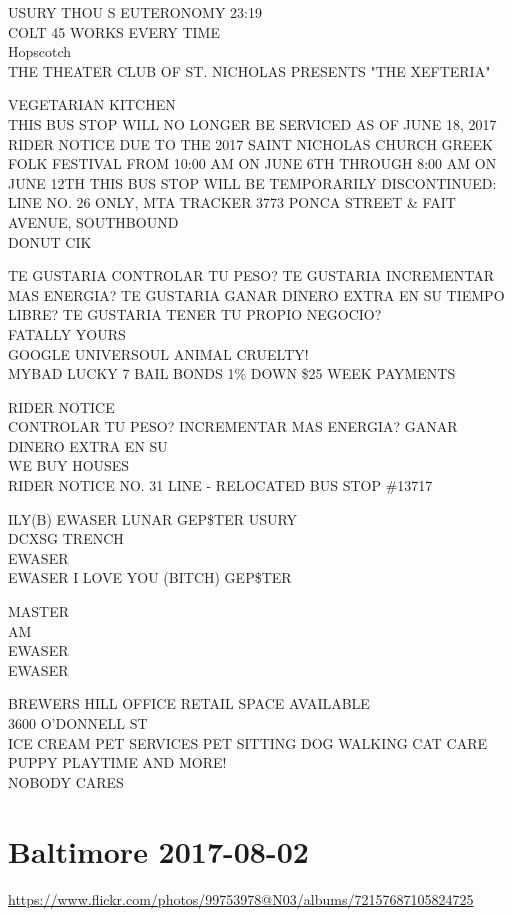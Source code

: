 \documentclass[10pt,letterpaper]{article}
\begin{document}
USURY THOU S EUTERONOMY 23:19\\
COLT 45 WORKS EVERY TIME\\
Hopscotch\\
THE THEATER CLUB OF ST. NICHOLAS PRESENTS "THE XEFTERIA"

VEGETARIAN KITCHEN\\
THIS BUS STOP WILL NO LONGER BE SERVICED AS OF JUNE 18, 2017\\
RIDER NOTICE DUE TO THE 2017 SAINT NICHOLAS CHURCH GREEK FOLK FESTIVAL FROM 10:00 AM ON JUNE 6TH THROUGH 8:00 AM ON JUNE 12TH THIS BUS STOP WILL BE TEMPORARILY DISCONTINUED: LINE NO. 26 ONLY, MTA TRACKER 3773 PONCA STREET \& FAIT AVENUE, SOUTHBOUND\\
DONUT CIK

TE GUSTARIA CONTROLAR TU PESO?  TE GUSTARIA INCREMENTAR MAS ENERGIA?  TE GUSTARIA GANAR DINERO EXTRA EN SU TIEMPO LIBRE?  TE GUSTARIA TENER TU PROPIO NEGOCIO?\\
FATALLY YOURS\\
GOOGLE UNIVERSOUL ANIMAL CRUELTY!\\
MYBAD LUCKY 7 BAIL BONDS 1\% DOWN \$25 WEEK PAYMENTS

RIDER NOTICE\\
CONTROLAR TU PESO? INCREMENTAR MAS ENERGIA? GANAR DINERO EXTRA EN SU\\
WE BUY HOUSES\\
RIDER NOTICE NO. 31 LINE {-} RELOCATED BUS STOP \#13717

ILY(B) EWASER LUNAR GEP\$TER USURY\\
DCXSG TRENCH\\
EWASER\\
EWASER I LOVE YOU (BITCH) GEP\$TER

MASTER\\
AM\\
EWASER\\
EWASER

BREWERS HILL OFFICE RETAIL SPACE AVAILABLE\\
3600 O'DONNELL ST\\
ICE CREAM PET SERVICES PET SITTING DOG WALKING CAT CARE PUPPY PLAYTIME AND MORE!\\
NOBODY CARES


\section*{Baltimore 2017-08-02}

\url{https://www.flickr.com/photos/99753978@N03/albums/72157687105824725}
\end{document}
